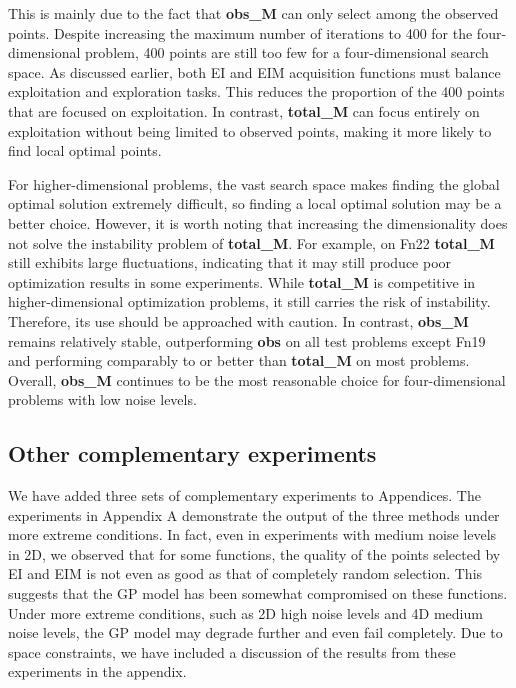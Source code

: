 \documentclass{article}
\begin{document}
\hspace{2em}This is mainly due to the fact that \textbf{obs\_M} can only select among the observed points. Despite increasing the maximum number of iterations to 400 for the four-dimensional problem, 400 points are still too few for a four-dimensional search space.  As discussed earlier, both EI and EIM acquisition functions must balance exploitation and exploration tasks. This reduces the proportion of the 400 points that are focused on exploitation. In contrast, \textbf{total\_M} can focus entirely on exploitation without being limited to observed points, making it more likely to find local optimal points. 

\hspace{2em}For higher-dimensional problems, the vast search space makes finding the global optimal solution extremely difficult, so finding a local optimal solution may be a better choice. However, it is worth noting that increasing the dimensionality does not solve the instability problem of \textbf{total\_M}. For example, on Fn22 \textbf{total\_M} still exhibits large fluctuations, indicating that it may still produce poor optimization results in some experiments. While \textbf{total\_M} is competitive in higher-dimensional optimization problems, it still carries the risk of instability. Therefore, its use should be approached with caution. In contrast, \textbf{obs\_M} remains relatively stable, outperforming \textbf{obs} on all test problems except Fn19 and performing comparably to or better than \textbf{total\_M} on most problems. Overall, \textbf{obs\_M} continues to be the most reasonable choice for four-dimensional problems with low noise levels. 

\subsection{Other complementary experiments}
\hspace{2em}We have added three sets of complementary experiments to Appendices. The experiments in Appendix A demonstrate the output of the three methods under more extreme conditions. In fact, even in experiments with medium noise levels in 2D, we observed that for some functions, the quality of the points selected by EI and EIM is not even as good as that of completely random selection. This suggests that the GP model has been somewhat compromised on these functions. Under more extreme conditions, such as 2D high noise levels and 4D medium noise levels, the GP model may degrade further and even fail completely. Due to space constraints, we have included a discussion of the results from these experiments in the appendix.
\end{document}
